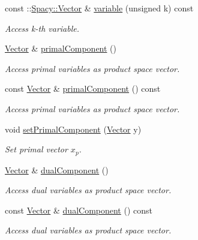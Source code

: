 \begin{DoxyCompactItemize}
const \+::\hyperlink{classSpacy_1_1Vector}{Spacy\+::\+Vector} \& \hyperlink{classSpacy_1_1ProductSpace_1_1Vector_a0031a1cd87d68721082f3fb167e0be3c_a0031a1cd87d68721082f3fb167e0be3c}{variable} (unsigned k) const 
\begin{DoxyCompactList}\small\item\em Access k-\/th variable. \end{DoxyCompactList}\item 
\hyperlink{classSpacy_1_1ProductSpace_1_1Vector}{Vector} \& \hyperlink{classSpacy_1_1ProductSpace_1_1Vector_a6db2f7c89b9372c8c27292fe34b88d0c_a6db2f7c89b9372c8c27292fe34b88d0c}{primal\+Component} ()
\begin{DoxyCompactList}\small\item\em Access primal variables as product space vector. \end{DoxyCompactList}\item 
const \hyperlink{classSpacy_1_1ProductSpace_1_1Vector}{Vector} \& \hyperlink{classSpacy_1_1ProductSpace_1_1Vector_afa3df5ffaf7b27730b293083686032ed_afa3df5ffaf7b27730b293083686032ed}{primal\+Component} () const 
\begin{DoxyCompactList}\small\item\em Access primal variables as product space vector. \end{DoxyCompactList}\item 
void \hyperlink{classSpacy_1_1ProductSpace_1_1Vector_ac919eaa4554059f2ff3ffeadbd49b2db_ac919eaa4554059f2ff3ffeadbd49b2db}{set\+Primal\+Component} (\hyperlink{classSpacy_1_1ProductSpace_1_1Vector}{Vector} y)
\begin{DoxyCompactList}\small\item\em Set primal vector $x_p$. \end{DoxyCompactList}\item 
\hyperlink{classSpacy_1_1ProductSpace_1_1Vector}{Vector} \& \hyperlink{classSpacy_1_1ProductSpace_1_1Vector_a8cdf126987ec5e869adedc8a568d85d7_a8cdf126987ec5e869adedc8a568d85d7}{dual\+Component} ()
\begin{DoxyCompactList}\small\item\em Access dual variables as product space vector. \end{DoxyCompactList}\item 
const \hyperlink{classSpacy_1_1ProductSpace_1_1Vector}{Vector} \& \hyperlink{classSpacy_1_1ProductSpace_1_1Vector_a76c64bb4ff6e4f102b2c2eab4b1e4858_a76c64bb4ff6e4f102b2c2eab4b1e4858}{dual\+Component} () const 
\begin{DoxyCompactList}\small\item\em Access dual variables as product space vector. \end{DoxyCompactList}\item 

\end{DoxyCompactItemize}
